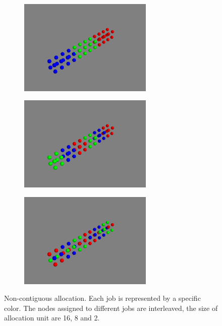 \begin{figure}[t]
    \centering
    \begin{subfigure}[t]{0.32\textwidth}
        \centering
        \includegraphics[height=1.8in]{figs/allocshape/unitsize/unit16}
        \caption{ }
        \label{fig:noncont_sub1}
    \end{subfigure}%
    \hspace{1em}%
    \begin{subfigure}[t]{0.32\textwidth}
        \centering
        \includegraphics[height=1.8in]{figs/allocshape/unitsize/unit8}
        \caption{ }
        \label{fig:noncont_sub2}
    \end{subfigure}%
    \hspace{1em}%
    \begin{subfigure}[t]{0.32\textwidth}
        \centering
        \includegraphics[height=1.8in]{figs/allocshape/unitsize/unit2}
        \caption{ }
        \label{fig:noncont_sub3}
    \end{subfigure}%
    \caption{
    Non-contiguous allocation. Each job is represented by a specific color. 
    The nodes assigned to different jobs are interleaved, 
    the size of allocation unit are 16, 8 and 2.
    }
    \label{fig:alloc-shapes}
\end{figure}


